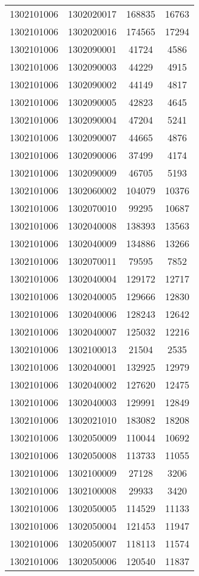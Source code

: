 \begin{longtable}{llcc}
1302101006 & 1302020017 & 168835 & 16763\\
1302101006 & 1302020016 & 174565 & 17294\\
1302101006 & 1302090001 & 41724 & 4586\\
1302101006 & 1302090003 & 44229 & 4915\\
1302101006 & 1302090002 & 44149 & 4817\\
1302101006 & 1302090005 & 42823 & 4645\\
1302101006 & 1302090004 & 47204 & 5241\\
1302101006 & 1302090007 & 44665 & 4876\\
1302101006 & 1302090006 & 37499 & 4174\\
1302101006 & 1302090009 & 46705 & 5193\\
1302101006 & 1302060002 & 104079 & 10376\\
1302101006 & 1302070010 & 99295 & 10687\\
1302101006 & 1302040008 & 138393 & 13563\\
1302101006 & 1302040009 & 134886 & 13266\\
1302101006 & 1302070011 & 79595 & 7852\\
1302101006 & 1302040004 & 129172 & 12717\\
1302101006 & 1302040005 & 129666 & 12830\\
1302101006 & 1302040006 & 128243 & 12642\\
1302101006 & 1302040007 & 125032 & 12216\\
1302101006 & 1302100013 & 21504 & 2535\\
1302101006 & 1302040001 & 132925 & 12979\\
1302101006 & 1302040002 & 127620 & 12475\\
1302101006 & 1302040003 & 129991 & 12849\\
1302101006 & 1302021010 & 183082 & 18208\\
1302101006 & 1302050009 & 110044 & 10692\\
1302101006 & 1302050008 & 113733 & 11055\\
1302101006 & 1302100009 & 27128 & 3206\\
1302101006 & 1302100008 & 29933 & 3420\\
1302101006 & 1302050005 & 114529 & 11133\\
1302101006 & 1302050004 & 121453 & 11947\\
1302101006 & 1302050007 & 118113 & 11574\\
1302101006 & 1302050006 & 120540 & 11837\\

\end{longtable}
